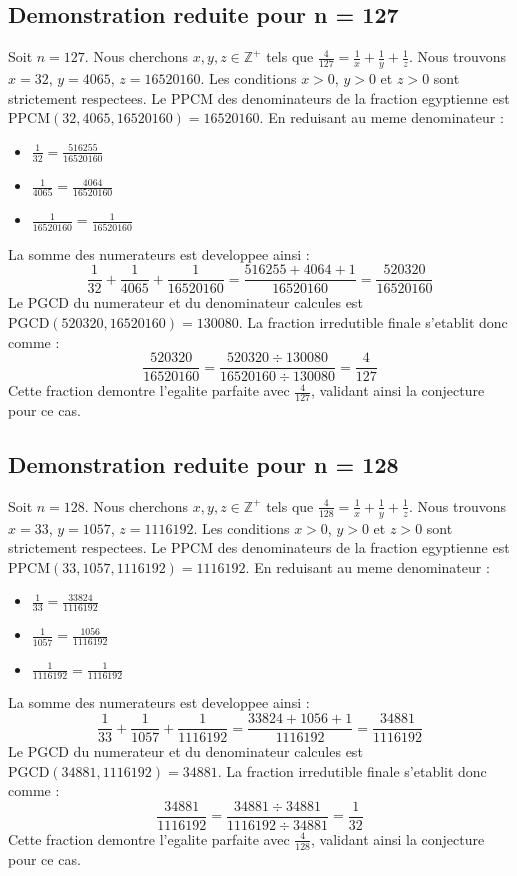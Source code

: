 \documentclass[11pt,a4paper]{article}
\begin{document}
\subsection{Demonstration reduite pour n = 127}
Soit $n = 127$. Nous cherchons $x, y, z \in \mathbb{Z}^{+}$ tels que $\frac{4}{127} = \frac{1}{x} + \frac{1}{y} + \frac{1}{z}$.
Nous trouvons $x = 32$, $y = 4065$, $z = 16520160$.
Les conditions $x > 0$, $y > 0$ et $z > 0$ sont strictement respectees.
Le PPCM des denominateurs de la fraction egyptienne est $\text{PPCM}(32, 4065, 16520160) = 16520160$.
En reduisant au meme denominateur :
\begin{itemize}
    \item $\frac{1}{32} = \frac{516255}{16520160}$
    \item $\frac{1}{4065} = \frac{4064}{16520160}$
    \item $\frac{1}{16520160} = \frac{1}{16520160}$
\end{itemize}
La somme des numerateurs est developpee ainsi :
$$ \frac{1}{32} + \frac{1}{4065} + \frac{1}{16520160} = \frac{516255 + 4064 + 1}{16520160} = \frac{520320}{16520160} $$
Le PGCD du numerateur et du denominateur calcules est $\text{PGCD}(520320, 16520160) = 130080$.
La fraction irredutible finale s'etablit donc comme :
$$ \frac{520320}{16520160} = \frac{520320 \div 130080}{16520160 \div 130080} = \frac{4}{127} $$
Cette fraction demontre l'egalite parfaite avec $\frac{4}{127}$, validant ainsi la conjecture pour ce cas.

\subsection{Demonstration reduite pour n = 128}
Soit $n = 128$. Nous cherchons $x, y, z \in \mathbb{Z}^{+}$ tels que $\frac{4}{128} = \frac{1}{x} + \frac{1}{y} + \frac{1}{z}$.
Nous trouvons $x = 33$, $y = 1057$, $z = 1116192$.
Les conditions $x > 0$, $y > 0$ et $z > 0$ sont strictement respectees.
Le PPCM des denominateurs de la fraction egyptienne est $\text{PPCM}(33, 1057, 1116192) = 1116192$.
En reduisant au meme denominateur :
\begin{itemize}
    \item $\frac{1}{33} = \frac{33824}{1116192}$
    \item $\frac{1}{1057} = \frac{1056}{1116192}$
    \item $\frac{1}{1116192} = \frac{1}{1116192}$
\end{itemize}
La somme des numerateurs est developpee ainsi :
$$ \frac{1}{33} + \frac{1}{1057} + \frac{1}{1116192} = \frac{33824 + 1056 + 1}{1116192} = \frac{34881}{1116192} $$
Le PGCD du numerateur et du denominateur calcules est $\text{PGCD}(34881, 1116192) = 34881$.
La fraction irredutible finale s'etablit donc comme :
$$ \frac{34881}{1116192} = \frac{34881 \div 34881}{1116192 \div 34881} = \frac{1}{32} $$
Cette fraction demontre l'egalite parfaite avec $\frac{4}{128}$, validant ainsi la conjecture pour ce cas.
\end{document}
